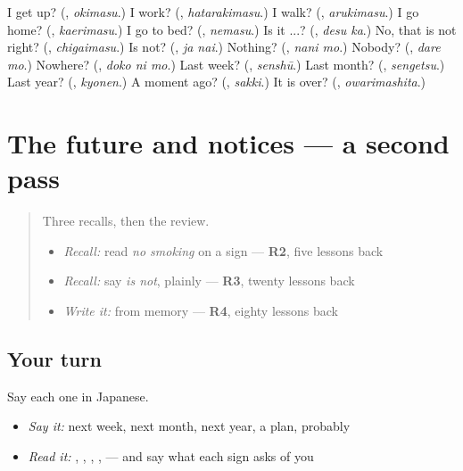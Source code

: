 \begin{tcolorbox}[breakable,colback=teal!4,colframe=teal!35!black,title={Before you move on}]
I get up? (\textbf{}, \emph{okimasu}.) I work? (\textbf{}, \emph{hatarakimasu}.) I walk? (\textbf{}, \emph{arukimasu}.) I go home? (\textbf{}, \emph{kaerimasu}.) I go to bed? (\textbf{}, \emph{nemasu}.) Is it ...? (\textbf{}, \emph{desu ka}.) No, that is not right? (\textbf{}, \emph{chigaimasu}.) Is not? (\textbf{}, \emph{ja nai}.) Nothing? (\textbf{}, \emph{nani mo}.) Nobody? (\textbf{}, \emph{dare mo}.) Nowhere? (\textbf{}, \emph{doko ni mo}.) Last week? (\textbf{}, \emph{senshū}.) Last month? (\textbf{}, \emph{sengetsu}.) Last year? (\textbf{}, \emph{kyonen}.) A moment ago? (\textbf{}, \emph{sakki}.) It is over? (\textbf{}, \emph{owarimashita}.)
\end{tcolorbox}
\section[(dialogue)]{The future and notices — a second pass}

\label{lesson:JA-R142-second-pass-the-future-and-notices}



\begin{quote}
Three recalls, then the review.

\begin{itemize}
\raggedright
  \item \emph{Recall:} read \emph{no smoking} on a sign — \textbf{R2}, five lessons back
  \item \emph{Recall:} say \emph{is not}, plainly — \textbf{R3}, twenty lessons back
  \item \emph{Write it:} \textbf{} from memory — \textbf{R4}, eighty lessons back
\end{itemize}
\end{quote}

\subsection*{Your turn}
Say each one in Japanese.

\begin{itemize}
\raggedright
  \item \emph{Say it:} next week, next month, next year, a plan, probably
  \item \emph{Read it:} \textbf{}, \textbf{}, \textbf{}, \textbf{}, \textbf{} — and say what each sign asks of you
\end{itemize}

